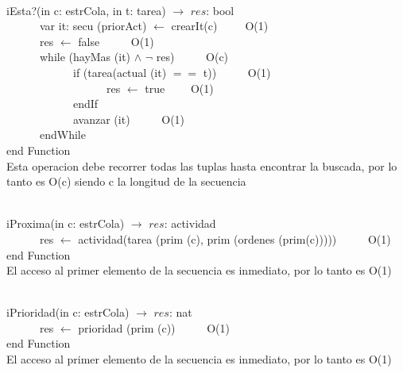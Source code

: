 \documentclass[a4paper,10pt]{article}
\begin{document}
\begin{algoritmo}
\caption{}\\
  iEsta?(in c: estrCola, in t: tarea) $\rightarrow$ $res$: bool \\
	\indent \ \ \ \ \ \ var it: secu (priorAct) $\gets$ crearIt(c)\ \ \ \ \ O(1)\\
	\indent \ \ \ \ \ \ res $\gets$ false \ \ \ \ \ O(1)\\
	\indent \ \ \ \ \ \ while (hayMas (it) $\wedge$ $\neg$ res) \ \ \ \ \ O(c)\\
	\indent \ \ \ \ \ \ \ \ \ \ \ \  if (tarea(actual (it) $==$ t))  \ \ \ \ \ O(1)\\
	\indent \ \ \ \ \ \ \ \ \ \ \ \ \ \ \ \ \ \ res $\gets$ true  \ \ \ \ O(1)\\
	\indent \ \ \ \ \ \ \ \ \ \ \ \  endIf \ \ \ \ \ \\
	\indent \ \ \ \ \ \ \ \ \ \ \ \  avanzar (it) \ \ \ \ \ O(1)\\
	\indent \ \ \ \ \ \ endWhile \ \ \ \ \ \\
   end Function \\
   
   Esta operacion debe recorrer todas las tuplas hasta encontrar la buscada, por lo tanto es O(c) siendo c la longitud de la secuencia
\end{algoritmo}

\begin{algoritmo}
\caption{}\\
  iProxima(in c: estrCola) $\rightarrow$ $res$: actividad \\
	\indent \ \ \ \ \ \  res $\gets$ actividad(tarea (prim (c), prim (ordenes (prim(c)))))  \ \ \ \ \ O(1)\\
   end Function \\
   
   El acceso al primer elemento de la secuencia es inmediato, por lo tanto es O(1)
\end{algoritmo}

\begin{algoritmo}
\caption{}\\
  iPrioridad(in c: estrCola) $\rightarrow$ $res$: nat \\
	\indent \ \ \ \ \ \  res $\gets$ prioridad (prim (c))  \ \ \ \ \ O(1)\\
    end Function \\
   
   El acceso al primer elemento de la secuencia es inmediato, por lo tanto es O(1)
\end{algoritmo}
\end{document}
